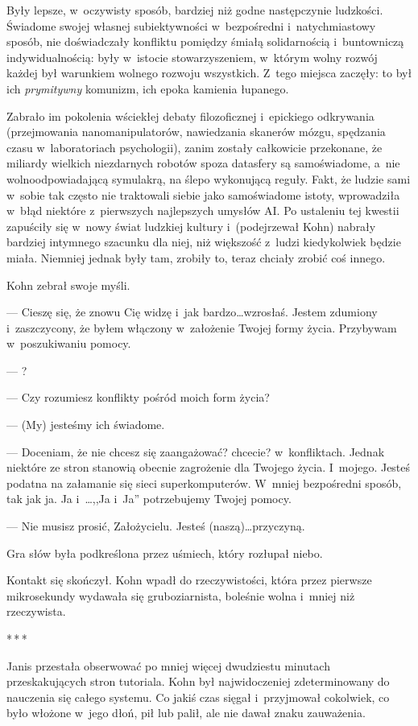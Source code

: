 \documentclass[oneside,polish,11pt,sfheadings]{mwbk}
\newcommand{\threeast}{\bigskip\par\centerline{*\,*\,*}\medskip\par}%
\begin{document}
Były lepsze, w~oczywisty sposób, bardziej niż godne następczynie
ludzkości. Świadome swojej własnej subiektywności w~bezpośredni i~natychmiastowy sposób, nie doświadczały konfliktu pomiędzy śmiałą
solidarnością i~buntowniczą indywidualnością: były w~istocie
stowarzyszeniem, w~którym wolny rozwój każdej był warunkiem wolnego
rozwoju wszystkich. Z~tego miejsca zaczęły: to był ich \emph{prymitywny}
komunizm, ich epoka kamienia łupanego.

Zabrało im pokolenia wściekłej debaty filozoficznej i~epickiego
odkrywania (przejmowania nanomanipulatorów, nawiedzania skanerów mózgu,
spędzania czasu w~laboratoriach psychologii), zanim zostały całkowicie
przekonane, że miliardy wielkich niezdarnych robotów spoza datasfery są
samoświadome, a~nie wolnoodpowiadającą symulakrą, na ślepo wykonującą
reguły. Fakt, że ludzie sami w~sobie tak często nie traktowali siebie
jako samoświadome istoty, wprowadziła w~błąd niektóre z~pierwszych
najlepszych umysłów AI. Po ustaleniu tej kwestii zapuściły się w~nowy
świat ludzkiej kultury i~(podejrzewał Kohn) nabrały bardziej intymnego
szacunku dla niej, niż większość z~ludzi kiedykolwiek będzie miała.
Niemniej jednak były tam, zrobiły to, teraz chciały zrobić coś innego.

Kohn zebrał swoje myśli.

--- Cieszę się, że znowu Cię widzę i~jak bardzo\ldots wzrosłaś. Jestem
zdumiony i~zaszczycony, że byłem włączony w~założenie Twojej formy
życia. Przybywam w~poszukiwaniu pomocy. 

--- ?

--- Czy rozumiesz konflikty pośród moich form życia?

--- (My) jesteśmy ich świadome.

--- Doceniam, że nie chcesz się zaangażować? chcecie? w~konfliktach. Jednak niektóre ze stron stanowią obecnie zagrożenie dla
Twojego życia. I~mojego. Jesteś podatna na załamanie się sieci
superkomputerów. W~mniej bezpośredni sposób, tak jak ja. Ja i~\ldots ,,Ja i~Ja'' potrzebujemy Twojej pomocy.

--- Nie musisz prosić, Założycielu. Jesteś (naszą)\ldots przy\-czyną.

Gra słów była podkreślona przez uśmiech, który rozłupał niebo.

Kontakt się skończył. Kohn wpadł do rzeczywistości, która przez pierwsze
mikrosekundy wydawała się gruboziarnista, boleśnie wolna i~mniej niż
rzeczywista.

  \threeast 

Janis przestała obserwować po mniej więcej dwudziestu minutach
przeskakujących stron tutoriala. Kohn był najwidoczeniej zdeterminowany
do nauczenia się całego systemu. Co jakiś czas sięgał i~przyjmował
cokolwiek, co było włożone w~jego dłoń, pił lub palił, ale nie dawał
znaku zauważenia.
\end{document}
